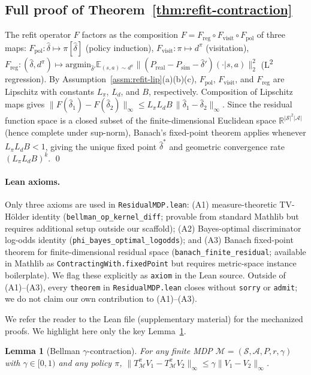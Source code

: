 \documentclass{article}
\newtheorem{lemma}[theorem]{Lemma}
\theoremstyle{definition}
\newcommand{\Psim}{P_{\mathrm{sim}}}
\newcommand{\Preal}{P_{\mathrm{real}}}
\begin{document}
\subsection{Full proof of Theorem~\ref{thm:refit-contraction}}

The refit operator $F$ factors as the composition
$F = F_\mathrm{reg}\circ F_\mathrm{visit}\circ F_\mathrm{pol}$ of
three maps: $F_\mathrm{pol}:\hat\delta\mapsto\pi[\hat\delta]$ (policy
induction),
$F_\mathrm{visit}:\pi\mapsto d^\pi$ (visitation),
$F_\mathrm{reg}:(\hat\delta,d^\pi)\mapsto\mathrm{argmin}_{\hat\delta'}
\mathbb E_{(s,a)\sim d^\pi}\|(\Preal-\Psim-\hat\delta')(\cdot|s,a)\|_2^2$
(L\textsuperscript{2} regression).
By Assumption~\ref{assm:refit-lip}(a)(b)(c), $F_\mathrm{pol}$,
$F_\mathrm{visit}$, and $F_\mathrm{reg}$ are Lipschitz with constants
$L_\pi$, $L_d$, and $B$, respectively.  Composition of Lipschitz
maps gives $\|F(\hat\delta_1)-F(\hat\delta_2)\|_\infty \le
L_\pi L_d B\,\|\hat\delta_1-\hat\delta_2\|_\infty$.  Since the
residual function space is a closed subset of the finite-dimensional
Euclidean space $\mathbb R^{|\mathcal S|^2|\mathcal A|}$
(hence complete under sup-norm), Banach's fixed-point theorem
\cite{banach1922} applies whenever $L_\pi L_d B<1$, giving the unique
fixed point $\hat\delta^*$ and geometric convergence rate $(L_\pi L_d B)^k$.
\qed

\paragraph{Lean axioms.}  Only three axioms are used in
\texttt{ResidualMDP.lean}:
(A1) measure-theoretic TV-H\"older identity
(\texttt{bellman\_op\_kernel\_diff}; provable from standard Mathlib
but requires additional setup outside our scaffold);
(A2) Bayes-optimal discriminator log-odds identity
(\texttt{phi\_bayes\_optimal\_logodds}); and
(A3) Banach fixed-point theorem for finite-dimensional residual space
(\texttt{banach\_finite\_residual}; available in Mathlib as
\texttt{ContractingWith.fixedPoint} but requires metric-space
instance boilerplate).
We flag these explicitly as \texttt{axiom} in the Lean source.  Outside
of (A1)--(A3), every \texttt{theorem} in \texttt{ResidualMDP.lean} closes
without \texttt{sorry} or \texttt{admit}; we do not claim our own
contribution to (A1)--(A3).

We refer the reader to the Lean file (supplementary material) for the
mechanized proofs.  We highlight here only the key
Lemma~\ref{lem:bellman}.

\begin{lemma}[Bellman $\gamma$-contraction]
\label{lem:bellman}
For any finite MDP $\mathcal M=(\mathcal S,\mathcal A,P,r,\gamma)$ with
$\gamma\in[0,1)$ and any policy $\pi$,
$\|T^\pi_{\mathcal M}V_1 - T^\pi_{\mathcal M}V_2\|_\infty
\le\gamma\|V_1-V_2\|_\infty$.
\end{lemma}
\end{document}
